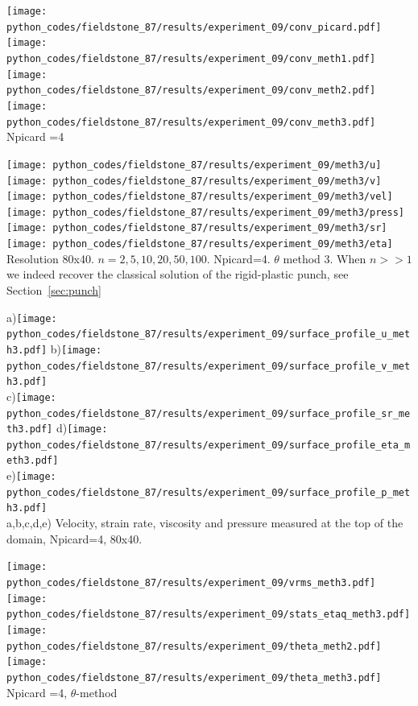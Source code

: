 \begin{center}
\texttt{[image: python\_codes/fieldstone\_87/results/experiment\_09/conv\_picard.pdf]}
\texttt{[image: python\_codes/fieldstone\_87/results/experiment\_09/conv\_meth1.pdf]}\\
\texttt{[image: python\_codes/fieldstone\_87/results/experiment\_09/conv\_meth2.pdf]}
\texttt{[image: python\_codes/fieldstone\_87/results/experiment\_09/conv\_meth3.pdf]}\\
{\captionfont Npicard =4}
\end{center}


\begin{center}
\texttt{[image: python\_codes/fieldstone\_87/results/experiment\_09/meth3/u]}
\texttt{[image: python\_codes/fieldstone\_87/results/experiment\_09/meth3/v]}
\texttt{[image: python\_codes/fieldstone\_87/results/experiment\_09/meth3/vel]}\\
\texttt{[image: python\_codes/fieldstone\_87/results/experiment\_09/meth3/press]}
\texttt{[image: python\_codes/fieldstone\_87/results/experiment\_09/meth3/sr]}
\texttt{[image: python\_codes/fieldstone\_87/results/experiment\_09/meth3/eta]}\\
{\captionfont Resolution 80x40. $n=2,5,10,20,50,100$. Npicard=4. 
$\theta$ method 3. When $n>>1$ we indeed recover the 
classical solution of the rigid-plastic punch, see Section~\ref{sec:punch}}
\end{center}


\begin{center}
a)\texttt{[image: python\_codes/fieldstone\_87/results/experiment\_09/surface\_profile\_u\_meth3.pdf]}
b)\texttt{[image: python\_codes/fieldstone\_87/results/experiment\_09/surface\_profile\_v\_meth3.pdf]}\\
c)\texttt{[image: python\_codes/fieldstone\_87/results/experiment\_09/surface\_profile\_sr\_meth3.pdf]}
d)\texttt{[image: python\_codes/fieldstone\_87/results/experiment\_09/surface\_profile\_eta\_meth3.pdf]}\\
e)\texttt{[image: python\_codes/fieldstone\_87/results/experiment\_09/surface\_profile\_p\_meth3.pdf]}\\
{\captionfont a,b,c,d,e) Velocity, strain rate, viscosity and pressure measured at the top of the domain, 
Npicard=4, 80x40.}
\end{center}

\begin{center}
\texttt{[image: python\_codes/fieldstone\_87/results/experiment\_09/vrms\_meth3.pdf]}
\texttt{[image: python\_codes/fieldstone\_87/results/experiment\_09/stats\_etaq\_meth3.pdf]}\\
\texttt{[image: python\_codes/fieldstone\_87/results/experiment\_09/theta\_meth2.pdf]}
\texttt{[image: python\_codes/fieldstone\_87/results/experiment\_09/theta\_meth3.pdf]}\\
{\captionfont Npicard =4, $\theta$-method}
\end{center}


